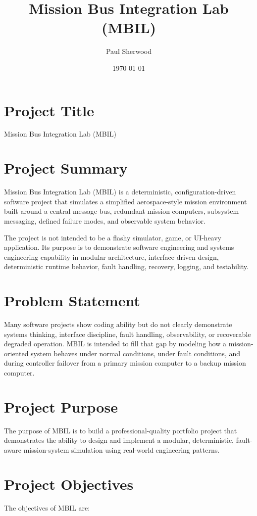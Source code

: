 \documentclass[12pt]{article}
\title{Mission Bus Integration Lab (MBIL)}
\author{Paul Sherwood}
\date{\today}
\begin{document}
\maketitle


\section{Project Title}
Mission Bus Integration Lab (MBIL)

\section{Project Summary}
Mission Bus Integration Lab (MBIL) is a deterministic, configuration-driven software project that simulates a simplified aerospace-style mission environment built around a central message bus, redundant mission computers, subsystem messaging, defined failure modes, and observable system behavior.

The project is not intended to be a flashy simulator, game, or UI-heavy application. Its purpose is to demonstrate software engineering and systems engineering capability in modular architecture, interface-driven design, deterministic runtime behavior, fault handling, recovery, logging, and testability.

\section{Problem Statement}
Many software projects show coding ability but do not clearly demonstrate systems thinking, interface discipline, fault handling, observability, or recoverable degraded operation. MBIL is intended to fill that gap by modeling how a mission-oriented system behaves under normal conditions, under fault conditions, and during controller failover from a primary mission computer to a backup mission computer.

\section{Project Purpose}
The purpose of MBIL is to build a professional-quality portfolio project that demonstrates the ability to design and implement a modular, deterministic, fault-aware mission-system simulation using real-world engineering patterns.

\section{Project Objectives}
The objectives of MBIL are:
\end{document}
